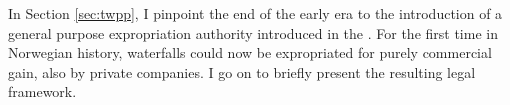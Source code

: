 %
%

In Section \ref{sec:twpp}, I pinpoint the end of the early era to the introduction of a general purpose expropriation authority introduced in the \cite{wra00}. For the first time in Norwegian history, waterfalls could now be expropriated for purely commercial gain, also by private companies. I go on to briefly present the resulting legal framework.

